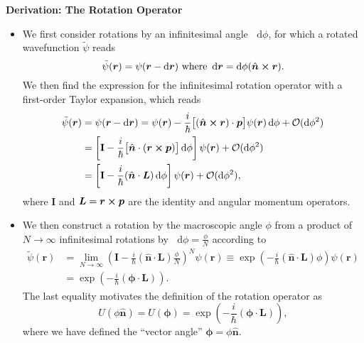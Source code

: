 \documentclass[11pt, a4paper]{article}
\newcommand{\diff}{\mathop{}\!\mathrm{d}} %
\renewcommand{\vec}[1]{\bm{#1}}  %
\newcommand{\mat}[1]{\mathbf{#1}}  %
\newcommand{\uvec}[1]{\hat{\vec{#1}}}  %
\renewcommand{\t}[1]{\tilde{#1}}
\renewcommand{\r}{\vec{r}}  %
\newcommand{\p}{\psi}  %
\begin{document}
\textbf{Derivation: The Rotation Operator}

\begin{itemize}
        \item We first consider rotations by an infinitesimal angle $ \diff \phi $, for which a rotated wavefunction $ \t{\p} $ reads
        \begin{equation*}
            \t{\p}(\r) = \p(\r - \diff \r) \ \text{where } \diff \r = \diff \phi (\uvec{n} \cross \r).
        \end{equation*}
        We then find the expression for the infinitesimal rotation operator with a first-order Taylor expansion, which reads
        \begin{align*}
            \t{\p}(\r) &= \p(\r - \diff \r) = \p(\r) - \frac{i}{\hbar}\big[(\uvec{n}\cross \r) \cdot \vec{p}\big]\p(\r)\diff \phi + \mathcal{O} (\diff \phi^{2})\\
            & = \left[\mat{I} - \frac{i}{\hbar}\big[\uvec{n}\cdot (\r \cross \vec{p})\big]\diff \phi\right] \p(\r)  + \mathcal{O} (\diff \phi^{2})\\
            & = \left[\mat{I} - \frac{i}{\hbar}(\uvec{n}\cdot \vec{L})\diff \phi\right] \p(\r) + \mathcal{O} (\diff \phi^{2}),
        \end{align*}
        where $ \mat{I} $ and $ \vec{L} = \r \cross \vec{p} $ are the identity and angular momentum operators.
        
        \item We then construct a rotation by the macroscopic angle $ \phi $ from a product of $ N \to \infty $ infinitesimal rotations by $ \diff \phi = \frac{\phi}{N} $ according to 
        \begin{align*}
            \tilde{\p}(\r) &= \lim_{N \to \infty} \left(\mat{I} - \frac{i}{\hbar}(\uvec{n}\cdot \vec{L})  \frac{\phi}{N} \right)^{N}\p(\r) \equiv \exp(- \frac{i}{\hbar}(\uvec{n}\cdot \vec{L})\phi) \p(\r)\\
            & = \exp(- \frac{i}{\hbar}(\vec{\phi}\cdot \vec{L})).
        \end{align*}
        The last equality motivates the definition of the rotation operator as
        \begin{equation*}
            U(\phi \uvec{n}) = U(\vec{\phi}) = \exp(- \frac{i}{\hbar}(\vec{\phi}\cdot \vec{L})),
        \end{equation*}
        where we have defined the ``vector angle'' $ \vec{\phi} = \phi \uvec{n} $.
	
\end{itemize}
\end{document}
